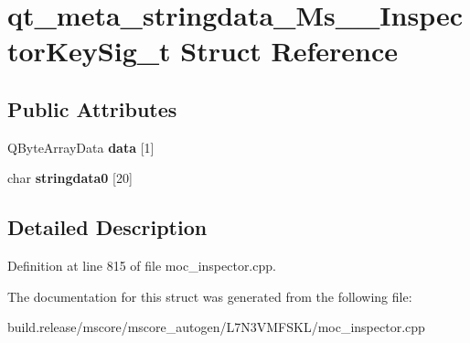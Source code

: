 \hypertarget{structqt__meta__stringdata___ms_____inspector_key_sig__t}{}\section{qt\+\_\+meta\+\_\+stringdata\+\_\+\+Ms\+\_\+\+\_\+\+Inspector\+Key\+Sig\+\_\+t Struct Reference}
\label{structqt__meta__stringdata___ms_____inspector_key_sig__t}
\subsection*{Public Attributes}
\begin{DoxyCompactItemize}
\item 
\mbox{\label{structqt__meta__stringdata___ms_____inspector_key_sig__t_a69ea8d0ace02f596939e1d3c2bab83d5}} 
Q\+Byte\+Array\+Data {\bfseries data} \mbox{[}1\mbox{]}
\item 
\mbox{\label{structqt__meta__stringdata___ms_____inspector_key_sig__t_af2ebac6dfa513a51b26886123a07a8bc}} 
char {\bfseries stringdata0} \mbox{[}20\mbox{]}
\end{DoxyCompactItemize}


\subsection{Detailed Description}


Definition at line 815 of file moc\+\_\+inspector.\+cpp.



The documentation for this struct was generated from the following file\+:\begin{DoxyCompactItemize}
\item 
build.\+release/mscore/mscore\+\_\+autogen/\+L7\+N3\+V\+M\+F\+S\+K\+L/moc\+\_\+inspector.\+cpp\end{DoxyCompactItemize}
